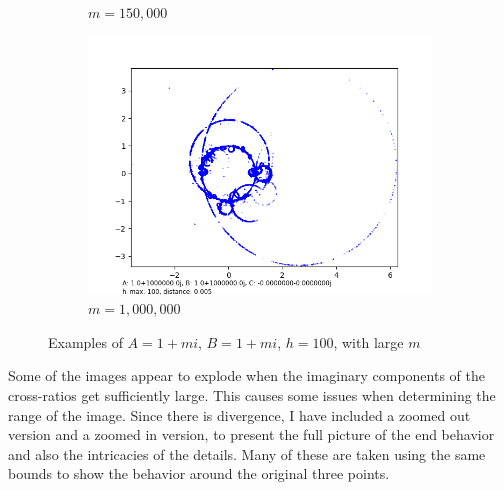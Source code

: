 \documentclass[12pt,a4paper,reqno,parskip=full]{amsart}
\numberwithin{equation}{section}
\theoremstyle{plain}
\theoremstyle{definition}
\begin{document}
\begin{figure}
\begin{subfigure}[b]{0.3\textwidth}
         \caption{$m=150,000$}
         \label{fig:m150,000}
     \end{subfigure}
     \hfill 
     \begin{subfigure}[b]{0.3\textwidth}
         \centering
         \includegraphics[width=\textwidth]{images/m/a1,000,000,b1,000,000,h100,d.005.png}
         \caption{$m=1,000,000$}
         \label{fig:m1,000,000}
     \end{subfigure}
        \caption{Examples of $A=1+mi$, $B=1+mi$, $h=100$, with large $m$}
        \label{fig:large-m}
\end{figure}

Some of the images appear to explode when the imaginary components of the cross-ratios get sufficiently large. This causes some issues when determining the range of the image. Since there is divergence, I have included a zoomed out version and a zoomed in version, to present the full picture of the end behavior and also the intricacies of the details. Many of these are taken using the same bounds to show the behavior around the original three points.
\end{document}
